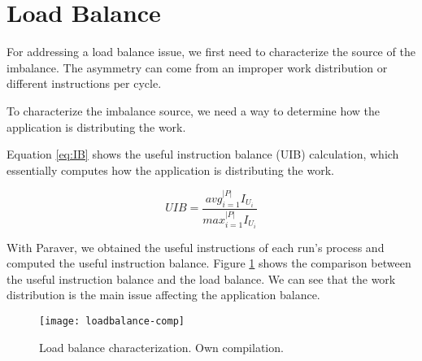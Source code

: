 \section{Load Balance}

For addressing a load balance issue, we first need to characterize the source of the imbalance. The asymmetry can come from an improper work distribution or different instructions per cycle.


To characterize the imbalance source, we need a way to determine how the application is distributing the work.

Equation \ref{eq:IB} shows the useful instruction balance (UIB) calculation, which essentially computes how the application is distributing the work. 

 \begin{equation}\label{eq:IB}
   UIB=\frac{avg_{i=1}^{|P|}I_{U_i}}{max_{i=1}^{|P|}I_{U_i}}
\end{equation}


With Paraver, we obtained the useful instructions of each run's process and computed the useful instruction balance. Figure \ref{lbchar} shows the comparison between the useful instruction balance and the load balance. We can see that the work distribution is the main issue affecting the application balance. 

\begin{figure}[h]
  \centering
  \texttt{[image: loadbalance-comp]}
  \caption[Load balance characterization.]{Load balance characterization. Own compilation.}
  \label{lbchar}
\end{figure}



